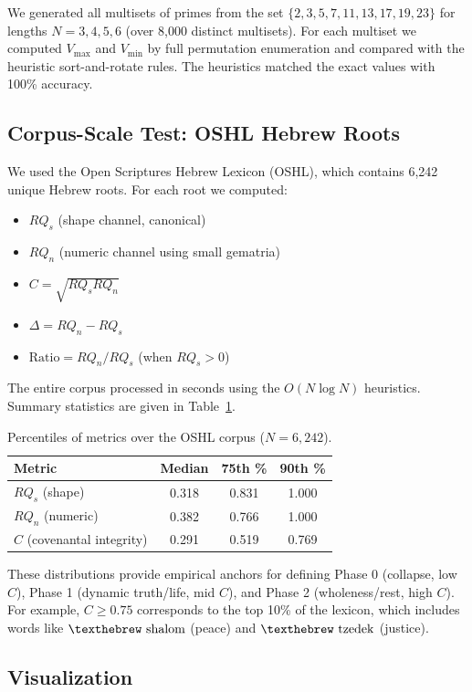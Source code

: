 \documentclass[12pt]{article}
\theoremstyle{plain}
\theoremstyle{definition}
\theoremstyle{remark}
\begin{document}
We generated all multisets of primes from the set $\{2,3,5,7,11,13,17,19,23\}$ for lengths $N=3,4,5,6$ (over 8,000 distinct multisets). For each multiset we computed $V_{\max}$ and $V_{\min}$ by full permutation enumeration and compared with the heuristic sort-and-rotate rules. The heuristics matched the exact values with 100\% accuracy.

\subsection{Corpus-Scale Test: OSHL Hebrew Roots}

We used the Open Scriptures Hebrew Lexicon (OSHL), which contains 6,242 unique Hebrew roots. For each root we computed:
\begin{itemize}
\item $RQ_s$ (shape channel, canonical)
\item $RQ_n$ (numeric channel using small gematria)
\item $C = \sqrt{RQ_s RQ_n}$
\item $\Delta = RQ_n - RQ_s$
\item $\text{Ratio} = RQ_n / RQ_s$ (when $RQ_s>0$)
\end{itemize}
The entire corpus processed in seconds using the $O(N \log N)$ heuristics. Summary statistics are given in Table~\ref{tab:percentiles}.

\begin{table}[h]
\centering
\caption{Percentiles of metrics over the OSHL corpus ($N=6,242$).}
\label{tab:percentiles}
\begin{tabular}{lccc}
\toprule
Metric & Median & 75th \% & 90th \% \\
\midrule
$RQ_s$ (shape) & 0.318 & 0.831 & 1.000 \\
$RQ_n$ (numeric) & 0.382 & 0.766 & 1.000 \\
$C$ (covenantal integrity) & 0.291 & 0.519 & 0.769 \\
\bottomrule
\end{tabular}
\end{table}

These distributions provide empirical anchors for defining Phase 0 (collapse, low $C$), Phase 1 (dynamic truth/life, mid $C$), and Phase 2 (wholeness/rest, high $C$). For example, $C \ge 0.75$ corresponds to the top 10\% of the lexicon, which includes words like $\text{\texthebrew shalom}$ (peace) and $\text{\texthebrew tzedek}$ (justice).

\subsection{Visualization}
\end{document}
